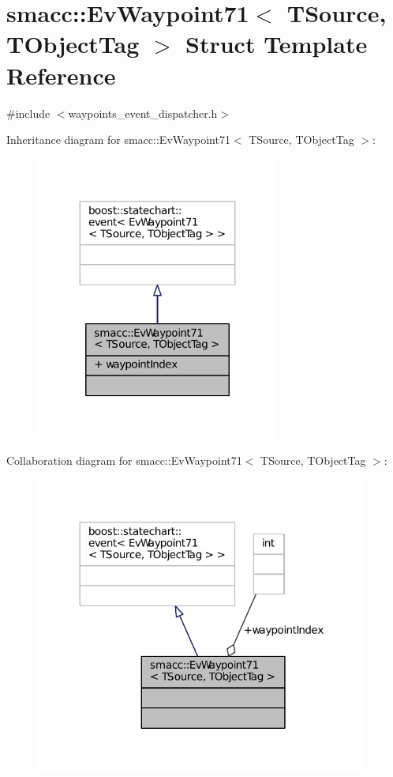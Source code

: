 \hypertarget{structsmacc_1_1EvWaypoint71}{}\section{smacc\+:\+:Ev\+Waypoint71$<$ T\+Source, T\+Object\+Tag $>$ Struct Template Reference}
\label{structsmacc_1_1EvWaypoint71}


{\ttfamily \#include $<$waypoints\+\_\+event\+\_\+dispatcher.\+h$>$}



Inheritance diagram for smacc\+:\+:Ev\+Waypoint71$<$ T\+Source, T\+Object\+Tag $>$\+:
\nopagebreak
\begin{figure}[H]
\begin{center}
\leavevmode
\includegraphics[width=227pt]{structsmacc_1_1EvWaypoint71__inherit__graph}
\end{center}
\end{figure}


Collaboration diagram for smacc\+:\+:Ev\+Waypoint71$<$ T\+Source, T\+Object\+Tag $>$\+:
\nopagebreak
\begin{figure}[H]
\begin{center}
\leavevmode
\includegraphics[width=312pt]{structsmacc_1_1EvWaypoint71__coll__graph}
\end{center}
\end{figure}
